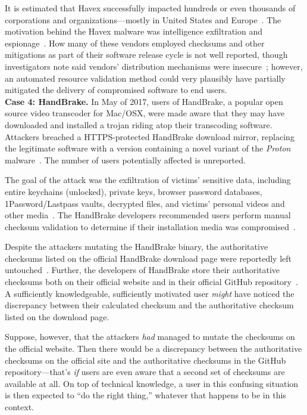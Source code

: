 It is estimated that Havex successfully impacted hundreds or even thousands of
corporations and organizations---mostly in United States and 
Europe~\cite{SCA-HAVEX2}. The motivation behind the Havex malware was
intelligence exfiltration and espionage~\cite{SCA-HAVEX1}. How many of these
vendors employed checksums and other mitigations as part of their software
release cycle is not well reported, though investigators note said vendors'
distribution mechanisms were insecure~\cite{SCA-HAVEX2}; however, an automated
resource validation method could very plausibly have partially mitigated the
delivery of compromised software to end users. \\

\noindent\textbf{Case 4: HandBrake.} In May of 2017, users of HandBrake, a
popular open source video transcoder for Mac/OSX, were made aware that they may
have downloaded and installed a trojan riding atop their transcoding software.
Attackers breached a HTTPS-protected HandBrake download mirror, replacing the
legitimate software with a version containing a novel variant of the
\emph{Proton} malware~\cite{SCA-HB1}. The number of users potentially affected
is unreported.

The goal of the attack was the exfiltration of victims' sensitive data,
including entire keychains (unlocked), private keys, browser password databases,
1Password/Lastpass vaults, decrypted files, and victims' personal videos and
other media~\cite{SCA-HB1}. The HandBrake developers recommended users perform
manual checksum validation to determine if their installation media was
compromised~\cite{SCA-HB2}.

Despite the attackers mutating the HandBrake binary, the authoritative checksums
listed on the official HandBrake download page were reportedly left
untouched~\cite{SCA-HB2}. Further, the developers of HandBrake store their
authoritative checksums both on their official website and in their official
GitHub repository~\cite{SCA-HB2}. A sufficiently knowledgeable, sufficiently
motivated user \emph{might} have noticed the discrepancy between their
calculated checksum and the authoritative checksum listed on the download page.

Suppose, however, that the attackers \textit{had} managed to mutate the
checksums on the official website. Then there would be a discrepancy between the
authoritative checksums on the official site and the authoritative checksums in
the GitHub repository---that's \emph{if} users are even aware that a second set
of checksums are available at all. On top of technical knowledge, a user in this
confusing situation is then expected to ``do the right thing,'' whatever that
happens to be in this context.

